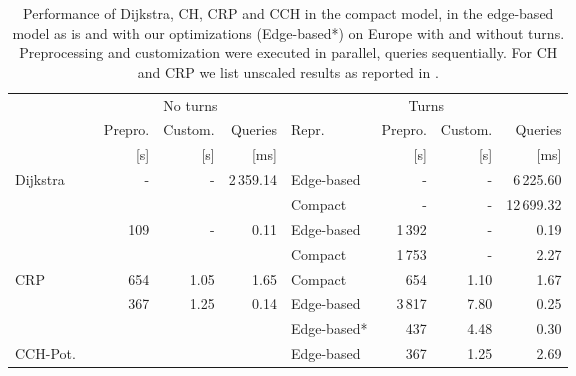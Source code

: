 \documentclass[a4paper, english, cleveref]{lipics-v2021}
\begin{document}
\begin{table}
\centering
\caption{
Performance of Dijkstra, CH, CRP and CCH in the compact model, in the edge-based model as is and with our optimizations (Edge-based*) on Europe with and without turns.
Preprocessing and customization were executed in parallel, queries sequentially.
For CH and CRP we list unscaled results as reported in \cite{DellingGPW17}.
}\label{tab:related_work_turns}
\begin{tabular}{l@{\hskip4pt}crrrlrrr}
\toprule
{}                        &                                      & \multicolumn{3}{c}{No turns}                                           & \multicolumn{4}{c}{Turns}                  \\
                                                                   \cmidrule(lr){3-5}                                                       \cmidrule(lr){6-9}
{}                        &                                      &             Prepro.  &            Custom. &                    Queries & Repr.      & Prepro. & Custom. &   Queries \\
{}                        &                                      &                 [s]  &                [s] &                       [ms] &            &     [s] &     [s] &      [ms] \\
\midrule
\multirow{2}{*}{Dijkstra} &                                      &   \multirow{2}{*}{-} & \multirow{2}{*}{-} & \multirow{2}{*}{2\,359.14} & Edge-based &       - &       - &  6\,225.60 \\
                          &                                      &                      &                    &                            &    Compact &       - &       - & 12\,699.32 \\
\addlinespace
\multirow{2}{*}{CH}       & \multirow{2}{*}{\cite{DellingGPW17}} & \multirow{2}{*}{109} & \multirow{2}{*}{-} &      \multirow{2}{*}{0.11} & Edge-based &  1\,392 &       - &       0.19 \\
                          &                                      &                      &                    &                            &    Compact &  1\,753 &       - &       2.27 \\
\addlinespace
CRP                       & \cite{DellingGPW17}                  &                  654 &               1.05 &                       1.65 &    Compact &     654 &    1.10 &       1.67 \\
\addlinespace
\multirow{2}{*}{CCH}      &                                      & \multirow{2}{*}{367} & \multirow{2}{*}{1.25} &   \multirow{2}{*}{0.14} & Edge-based &  3\,817 &    7.80 &       0.25 \\
                          &                                      &                      &                    &                            & Edge-based* &    437 &    4.48 &       0.30 \\
CCH-Pot.                  &                                      &                      &                    &                            & Edge-based &     367 &    1.25 &       2.69 \\
\bottomrule
\end{tabular}
\end{table}
\end{document}

